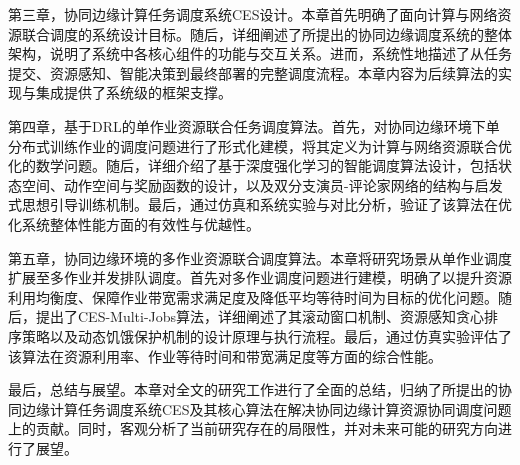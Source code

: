 第三章，协同边缘计算任务调度系统CES设计。本章首先明确了面向计算与网络资源联合调度的系统设计目标。随后，详细阐述了所提出的协同边缘调度系统的整体架构，说明了系统中各核心组件的功能与交互关系。进而，系统性地描述了从任务提交、资源感知、智能决策到最终部署的完整调度流程。本章内容为后续算法的实现与集成提供了系统级的框架支撑。

第四章，基于DRL的单作业资源联合任务调度算法。首先，对协同边缘环境下单分布式训练作业的调度问题进行了形式化建模，将其定义为计算与网络资源联合优化的数学问题。随后，详细介绍了基于深度强化学习的智能调度算法设计，包括状态空间、动作空间与奖励函数的设计，以及双分支演员-评论家网络的结构与启发式思想引导训练机制。最后，通过仿真和系统实验与对比分析，验证了该算法在优化系统整体性能方面的有效性与优越性。

第五章，协同边缘环境的多作业资源联合调度算法。本章将研究场景从单作业调度扩展至多作业并发排队调度。首先对多作业调度问题进行建模，明确了以提升资源利用均衡度、保障作业带宽需求满足度及降低平均等待时间为目标的优化问题。随后，提出了CES-Multi-Jobs算法，详细阐述了其滚动窗口机制、资源感知贪心排序策略以及动态饥饿保护机制的设计原理与执行流程。最后，通过仿真实验评估了该算法在资源利用率、作业等待时间和带宽满足度等方面的综合性能。

最后，总结与展望。本章对全文的研究工作进行了全面的总结，归纳了所提出的协同边缘计算任务调度系统CES及其核心算法在解决协同边缘计算资源协同调度问题上的贡献。同时，客观分析了当前研究存在的局限性，并对未来可能的研究方向进行了展望。
